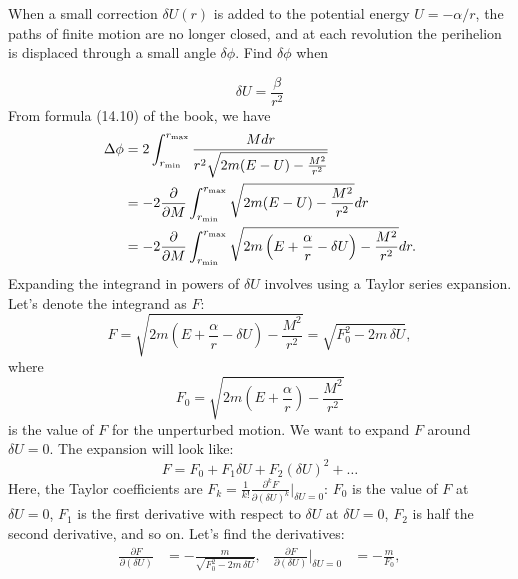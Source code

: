 
\begin{problem}[title={Perihelion precession from a perturbation}]
{
When a small correction $\delta U(r)$ is added to the potential energy $U=-\alpha/r$, the paths of finite motion are no longer closed, and at each revolution the perihelion is displaced through a small angle $\delta\phi$. Find $\delta\phi$ when
}{}{}
\end{problem}
\begin{subproblem}
{
\begin{equation*}
    \delta U = \frac{\beta}{r^2}
\end{equation*}
}
{
From formula (14.10) of the book, we have
\begin{align*}
    \Delta \phi &= 2\int_{r_{\text{min}}}^{r_{\text{max}}}\frac{Mdr}{r^2\sqrt{2m(E-U)-\frac{M^2}{r^2}}} \\
    &= -2\frac{\partial }{\partial M}\int_{r_{\text{min}}}^{r_{\text{max}}}\sqrt{2m(E-U)-\frac{M^2}{r^2}}dr \\
    &= -2\frac{\partial }{\partial M}\int_{r_{\text{min}}}^{r_{\text{max}}}\sqrt{2m\left(E+\frac{\alpha}{r}-\delta U\right)-\frac{M^2}{r^2}}dr.
\end{align*}
Expanding the integrand in powers of $\delta U$ involves using a Taylor series expansion. Let's denote the integrand as $F$:
\begin{equation*}
    F = \sqrt{2m\left(E+\frac{\alpha}{r}-\delta U\right)-\frac{M^2}{r^2}} = \sqrt{F_0^2 - 2m\,\delta U},
\end{equation*}
where
\begin{equation*}
    F_0 = \sqrt{2m\left(E+\frac{\alpha}{r}\right)-\frac{M^2}{r^2}}
\end{equation*}
is the value of $F$ for the unperturbed motion. We want to expand $F$ around $\delta U = 0$. The expansion will look like:
\begin{equation*}
    F = F_0 + F_1 \delta U + F_2 (\delta U)^2 + \ldots
\end{equation*}
Here, the Taylor coefficients are $F_k = \frac{1}{k!}\frac{\partial^k F}{\partial (\delta U)^k}\big|_{\delta U=0}$: $F_0$ is the value of $F$ at $\delta U = 0$, $F_1$ is the first derivative with respect to $\delta U$ at $\delta U = 0$, $F_2$ is half the second derivative, and so on. Let's find the derivatives:
\begin{align*}
    \frac{\partial F}{\partial (\delta U)} &= -\frac{m}{\sqrt{F_0^2 - 2m\,\delta U}}, &
    \frac{\partial F}{\partial (\delta U)}\Big|_{\delta U=0} &= -\frac{m}{F_0}, \\

\end{align*}}
\end{subproblem}
